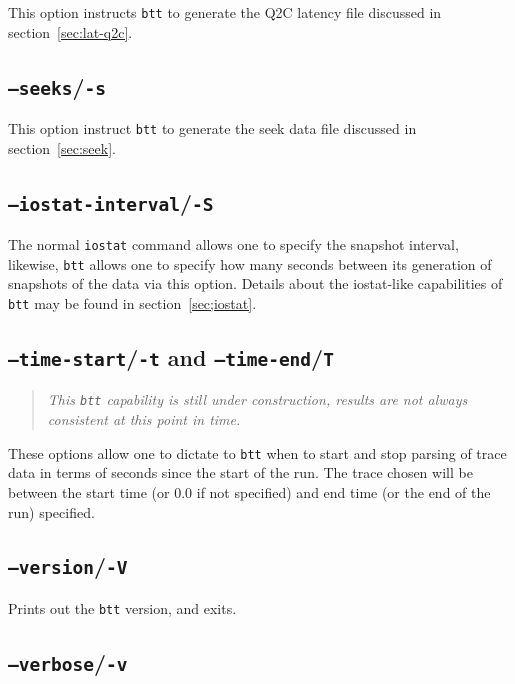 \documentclass{article}
\begin{document}
  This option instructs \texttt{btt} to generate the Q2C latency file
  discussed in section~\ref{sec:lat-q2c}.

\subsection{\label{sec:o-s}\texttt{--seeks}/\texttt{-s}}

  This option instruct \texttt{btt} to generate the seek data file
  discussed in section~\ref{sec:seek}.

\subsection{\label{sec:o-S}\texttt{--iostat-interval}/\texttt{-S}}

  The normal \texttt{iostat} command allows one to specify the snapshot
  interval, likewise, \texttt{btt} allows one to specify how many seconds
  between its generation of snapshots of the data via this option. Details
  about the iostat-like capabilities of \texttt{btt} may be found in
  section~\ref{sec;iostat}.

\subsection{\label{sec:o-tT}\texttt{--time-start}/\texttt{-t} and
\texttt{--time-end}/\texttt{T}}

  \begin{quote}
    \emph{This \texttt{btt} capability is still under construction, results are
    not always consistent at this point in time.}
  \end{quote}

  These options allow one to dictate to \texttt{btt} when to start and stop
  parsing of trace data in terms of seconds since the start of the run. The
  trace chosen will be between the start time (or 0.0 if not
  specified) and end time (or the end of the run) specified. 

\subsection{\label{sec:o-V}\texttt{--version}/\texttt{-V}}

  Prints out the \texttt{btt} version, and exits.

\subsection{\label{sec:o-v}\texttt{--verbose}/\texttt{-v}}
\end{document}

